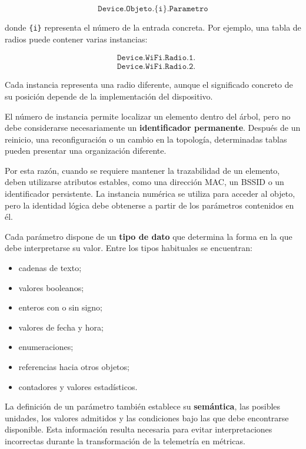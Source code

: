 \[
    \texttt{Device.Objeto.\{i\}.Parametro}
\]

donde \texttt{\{i\}} representa el número de la entrada concreta. Por
ejemplo, una tabla de radios puede contener varias instancias:

\[
\begin{aligned}
    &\texttt{Device.WiFi.Radio.1.}\\
    &\texttt{Device.WiFi.Radio.2.}
\end{aligned}
\]

Cada instancia representa una radio diferente, aunque el significado
concreto de su posición depende de la implementación del dispositivo.

El número de instancia permite localizar un elemento dentro del árbol,
pero no debe considerarse necesariamente un
\textbf{identificador permanente}. Después de un reinicio, una
reconfiguración o un cambio en la topología, determinadas tablas pueden
presentar una organización diferente.

Por esta razón, cuando se requiere mantener la trazabilidad de un
elemento, deben utilizarse atributos estables, como una dirección MAC, un
BSSID o un identificador persistente. La instancia numérica se utiliza
para acceder al objeto, pero la identidad lógica debe obtenerse a partir
de los parámetros contenidos en él.

Cada parámetro dispone de un
\textbf{tipo de dato} que determina la forma en la que debe
interpretarse su valor. Entre los tipos habituales se encuentran:

\begin{itemize}
    \item cadenas de texto;
    \item valores booleanos;
    \item enteros con o sin signo;
    \item valores de fecha y hora;
    \item enumeraciones;
    \item referencias hacia otros objetos;
    \item contadores y valores estadísticos.
\end{itemize}

La definición de un parámetro también establece su
\textbf{semántica}, las posibles unidades, los valores admitidos y las
condiciones bajo las que debe encontrarse disponible. Esta información
resulta necesaria para evitar interpretaciones incorrectas durante la
transformación de la telemetría en métricas.

